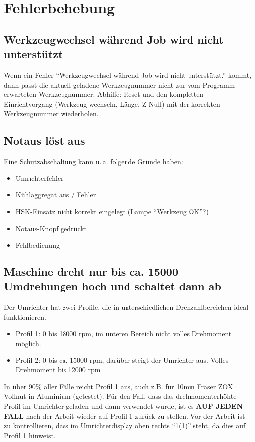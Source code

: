 \documentclass{\basedir/fablab-document}
\begin{document}
\section{Fehlerbehebung}

\subsection{Werkzeugwechsel während Job wird nicht unterstützt}
Wenn ein Fehler \enquote{Werkzeugwechsel während Job wird nicht unterstützt.} kommt, dann passt die aktuell geladene Werkzeugnummer nicht zur vom Programm erwarteten Werkzeugnummer. Abhilfe: Reset und den kompletten Einrichtvorgang (Werkzeug wechseln, Länge, Z-Null) mit der korrekten Werkzeugnummer wiederholen.

\subsection{Notaus löst aus}
Eine Schutzabschaltung kann u.\,a. folgende Gründe haben:
\begin{itemize}
	\item Umrichterfehler
	\item Kühlaggregat aus / Fehler
	\item HSK-Einsatz nicht korrekt eingelegt (Lampe \enquote{Werkzeug OK}?)
	\item Notaus-Knopf gedrückt
	\item Fehlbedienung
\end{itemize}

\subsection{Maschine dreht nur bis ca. 15000 Umdrehungen hoch und schaltet dann ab}
Der Umrichter hat zwei Profile, die in unterschiedlichen Drehzahlbereichen ideal funktionieren.
\begin{itemize}
	\item Profil 1: 0 bis 18000 rpm, im unteren Bereich nicht volles Drehmoment möglich. 
	\item Profil 2: 0 bis ca. 15000 rpm, darüber steigt der Umrichter aus. Volles Drehmoment bis 12000 rpm
\end{itemize}
In über 90\% aller Fälle reicht Profil 1 aus, auch z.B. für 10mm Fräser ZOX Vollnut in Aluminium (getestet). Für den Fall, dass das drehmomenterhöhte Profil im Umrichter geladen und dann verwendet wurde, ist es \textbf{AUF JEDEN FALL} nach der Arbeit wieder auf Profil 1 zurück zu stellen. Vor der Arbeit ist zu kontrollieren, dass im Umrichterdisplay oben rechts \enquote{1(1)} steht, da dies auf Profil 1 hinweist.
\end{document}
